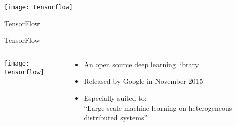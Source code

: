 
{
\begin{slide}{}
  \vspace{1.5cm}

  \texttt{[image: tensorflow]}

  \vspace{1cm}

  {
    \Huge
    \color{orange}
    TensorFlow
  }
\end{slide}
}

\addtocounter{framenumber}{-1}

\begin{slide}{TensorFlow}
\begin{columns}
  \begin{column}{0.5\textwidth}
    \hspace{1cm}\texttt{[image: tensorflow]}
  \end{column}
  \begin{column}{0.5\textwidth}
    \begin{itemize}
    \item<1-> An open source deep learning library
    \item<2-> Released by Google in November 2015
    \item<3-> Especially suited to:\\
              \vspace{0.2cm}
              ``Large-scale machine learning on
                heterogeneous distributed systems''
    \end{itemize}
  \end{column}
\end{columns}
\end{slide}

\graphicspath{{tensorflow-paper/presentation/figures/}}



% 

%


\graphicspath{{figures/}}

\newcommand{\volume}[8]{
  \yzplane{{#1 - 0.25}} {
    \draw ({#4/2}, #5) node {\footnotesize #7};
  }
  \yzplane{{#1 - 0.35}} {
    \draw (#4, {#5/2}) node {\footnotesize #8};
  }
  \yzplane{#1} {
    \draw (#2, 0) rectangle ++(#4, #5);
  }
  \yzplane{{#1 + #3}} {
    \draw (#2, 0) rectangle ++(#4, #5);
  }
  \xzplane{#2} {
    \draw (#1, 0) -- ++(#3, 0);
    \draw (#1, {#5 + 0.0375}) -- ++(#3, 0)
          node [midway, below] {\footnotesize #6};
  }
  \xzplane{{#2 + #4}} {
    \draw (#1, -0.035) -- ++(#3, 0);
    \draw (#1, #5) -- ++(#3, 0);
  }
}

